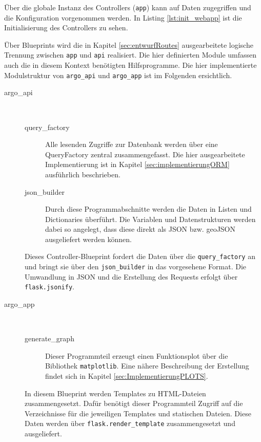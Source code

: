 

Über die globale Instanz des \gls{Controller}s (\texttt{app}) kann auf Daten zugegriffen und die Konfiguration vorgenommen werden. In Listing \ref{lst:init_webapp} ist die Initialisierung des \gls{Controller}s zu sehen.

Über Blueprints wird die in Kapitel \ref{sec:entwurfRoutes} ausgearbeitete logische Trennung zwischen \texttt{app} und \texttt{api} realisiert. Die hier definierten Module umfassen auch die in diesem Kontext benötigten Hilfsprogramme. Die hier implementierte Modulstruktur von \texttt{argo\_api} und \texttt{argo\_app} ist im Folgenden ersichtlich.

\begin{description}
 \item [argo\_api] $ $

    \begin{description}
     \item [query\_factory]
        Alle lesenden Zugriffe zur Datenbank werden über eine QueryFactory zentral zusammengefasst. Die hier ausgearbeitete Implementierung ist in Kapitel \ref{sec:implementierungORM} ausführlich beschrieben.

     \item [json\_builder]
        Durch diese Programmabschnitte werden die Daten in Listen und Dictionaries überführt. Die Variablen und Datenstrukturen werden dabei so angelegt, dass diese direkt als JSON bzw. geoJSON ausgeliefert werden können.
    \end{description}

    Dieses \gls{Controller}-Blueprint fordert die Daten über die \texttt{query\_factory} an und bringt sie über den \texttt{json\_builder} in das vorgesehene Format.  Die Umwandlung in JSON und die Erstellung des Requests erfolgt über \texttt{flask.jsonify}.
\pagebreak
 \item [argo\_app] $ $

    \begin{description}
     \item [generate\_graph] Dieser Programmteil erzeugt einen Funktionsplot über die Bibliothek \texttt{matplotlib}. Eine nähere Beschreibung der Erstellung findet sich in Kapitel \ref{sec:ImplementierungPLOTS}.
    \end{description}

    In diesem Blueprint werden Templates zu HTML-Dateien zusammengesetzt. Dafür benötigt dieser Programmteil Zugriff auf die Verzeichnisse für die jeweiligen Templates und statischen Dateien. Diese Daten werden über \texttt{flask.render\_template} zusammengesetzt und ausgeliefert.
\end{description}

